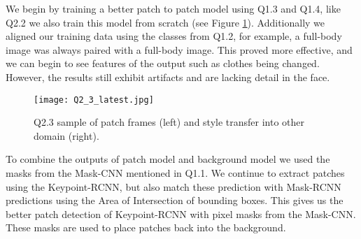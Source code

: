  We begin by training a better patch to patch model using Q1.3 and Q1.4, like Q2.2 we also train this model from scratch (see Figure \ref{fig:Q2_4}).
 Additionally we aligned our training data using the classes from Q1.2, for example, a full-body image was always paired with a full-body image.
 This proved more effective, and we can begin to see features of the output such as clothes being changed.
 However, the results still exhibit artifacts and are lacking detail in the face. 
 
 \begin{figure}[h!]
  \begin{center}
  \texttt{[image: Q2\_3\_latest.jpg]}
    \caption{Q2.3 sample of patch frames (left) and style transfer into other domain (right).}
    \label{fig:Q2_4}
  \end{center}
  \end{figure}
 
 To combine the outputs of patch model and background model we used the masks from the Mask-CNN mentioned in Q1.1.
 We continue to extract patches using the Keypoint-RCNN, but also match these prediction with Mask-RCNN predictions using the Area of Intersection of bounding boxes.
 This gives us the better patch detection of Keypoint-RCNN with pixel masks from the Mask-CNN.
 These masks are used to place patches back into the background.
 